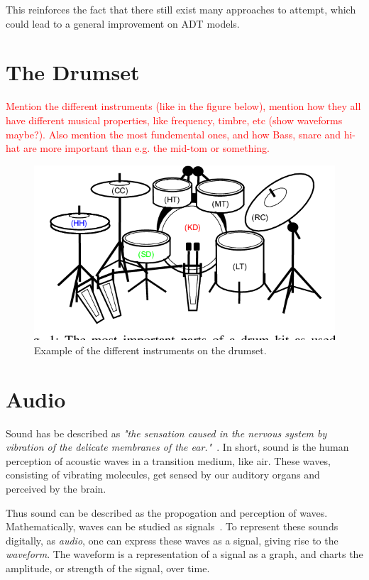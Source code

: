 This reinforces the fact that there still exist many approaches to attempt, which could lead to a general improvement on \gls{ADT} models.

\section{The Drumset}

\textcolor{red}{Mention the different instruments (like in the figure below), mention how they all have different musical properties, like frequency, timbre, etc (show waveforms maybe?). Also mention the most fundemental ones, and how Bass, snare and hi-hat are more important than e.g. the mid-tom or something.}

\begin{figure}[H]
    \centering
    \includegraphics[scale=0.5, trim={0 1cm 0 0},clip]{figures/drumset}
    \caption{Example of the different instruments on the drumset.}
    \label{DrumsetFigure}
\end{figure}

\section{Audio}

Sound has be described as \textit{"the sensation caused in the nervous system by vibration of the delicate membranes of the ear."}~\cite{1953fundamentals}. In short, sound is the human perception of acoustic waves in a transition medium, like air. These waves, consisting of vibrating molecules, get sensed by our auditory organs and perceived by the brain. 

Thus sound can be described as the propogation and perception of waves. Mathematically, waves can be studied as signals~\cite{8454362}. To represent these sounds digitally, as \textit{audio}, one can express these waves as a signal, giving rise to the \textit{waveform}. The waveform is a representation of a signal as a graph, and charts the amplitude, or strength of the signal, over time.

